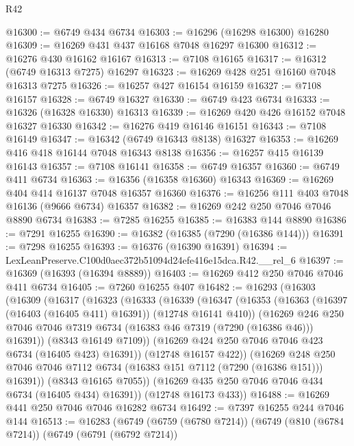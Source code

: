 \begin{lexlean}{R42}
\begin{coremodule}
{@16300 := @6749 @434 @6734
@16303 := @16296 (@16298 @16300) @16280
@16309 := @16269 @431 @437 @16168 @7048 @16297 @16300
@16312 := @16276 @430 @16162 @16167
@16313 := @7108 @16165
@16317 := @16312 (@6749 @16313 @7275) @16297
@16323 := @16269 @428 @251 @16160 @7048 @16313 @7275
@16326 := @16257 @427 @16154 @16159
@16327 := @7108 @16157
@16328 := @6749 @16327
@16330 := @6749 @423 @6734
@16333 := @16326 (@16328 @16330) @16313
@16339 := @16269 @420 @426 @16152 @7048 @16327 @16330
@16342 := @16276 @419 @16146 @16151
@16343 := @7108 @16149
@16347 := @16342 (@6749 @16343 @8138) @16327
@16353 := @16269 @416 @418 @16144 @7048 @16343 @8138
@16356 := @16257 @415 @16139 @16143
@16357 := @7108 @16141
@16358 := @6749 @16357
@16360 := @6749 @411 @6734
@16363 := @16356 (@16358 @16360) @16343
@16369 := @16269 @404 @414 @16137 @7048 @16357 @16360
@16376 := @16256 @111 @403 @7048 @16136 (@9666 @6734) @16357
@16382 := @16269 @242 @250 @7046 @7046 @8890 @6734
@16383 := @7285 @16255
@16385 := @16383 @144 @8890
@16386 := @7291 @16255
@16390 := @16382 (@16385 (@7290 (@16386 @144)))
@16391 := @7298 @16255
@16393 := @16376 (@16390 @16391)
@16394 := LexLeanPreserve.C100d0aec372b51094d24efe416e15dca.R42.__rel_6
@16397 := @16369 (@16393 (@16394 @8889))
@16403 := @16269 @412 @250 @7046 @7046 @411 @6734
@16405 := @7260 @16255 @407
@16482 := @16293
    (@16303
      (@16309
        (@16317
          (@16323
            (@16333
              (@16339
                (@16347
                  (@16353
                    (@16363 (@16397 (@16403 (@16405 @411) @16391)) (@12748 @16141 @410))
                    (@16269
                      @246
                      @250
                      @7046
                      @7046
                      @7319
                      @6734
                      (@16383 @46 @7319 (@7290 (@16386 @46)))
                      @16391))
                  (@8343 @16149 @7109))
                (@16269 @424 @250 @7046 @7046 @423 @6734 (@16405 @423) @16391))
              (@12748 @16157 @422))
            (@16269
              @248
              @250
              @7046
              @7046
              @7112
              @6734
              (@16383 @151 @7112 (@7290 (@16386 @151)))
              @16391))
          (@8343 @16165 @7055))
        (@16269 @435 @250 @7046 @7046 @434 @6734 (@16405 @434) @16391))
      (@12748 @16173 @433))
@16488 := @16269 @441 @250 @7046 @7046 @16282 @6734
@16492 := @7397 @16255 @244 @7046 @144
@16513 := @16283
    (@6749
      (@6759 (@6780 @7214))
      (@6749
        (@810 (@6784 @7214))
        (@6749
          (@6791 (@6792 @7214))
}
\end{coremodule}
\end{lexlean}
